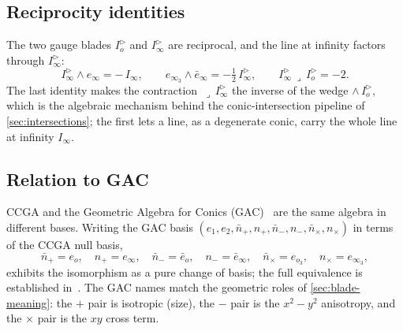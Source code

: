 \documentclass{birkjour}
\theoremstyle{definition}
\theoremstyle{remark}
\newcommand{\eo}{e_o}
\newcommand{\einf}{e_\infty}
\newcommand{\eobar}{\bar e_o}
\newcommand{\einfbar}{\bar e_\infty}
\newcommand{\Iod}{I_o^{\triangleright}}      %
\newcommand{\Iinfd}{I_\infty^{\triangleright}}%
\newcommand{\Iinf}{I_\infty}
\newcommand{\joinp}{\wedge}
\begin{document}
\subsection{Reciprocity identities}
\label{sec:reciprocity}
The two gauge blades $\Iod$ and $\Iinfd$ are reciprocal, and the line at infinity
factors through $\Iinfd$:
\begin{equation}\label{eq:reciprocity}
  \Iinfd \joinp \einf = -\,\Iinf,
  \qquad
  e_{\infty_3}\joinp\einfbar = -\tfrac12\,\Iinfd,
  \qquad
  \Iinfd \,\lrcorner\, \Iod = -2 .
\end{equation}
The last identity makes the contraction $\,\lrcorner\,\Iinfd$ the inverse of the
wedge $\joinp\,\Iod$, which is the algebraic mechanism behind the conic-intersection
pipeline of \cref{sec:intersections}; the first lets a line, as a degenerate conic,
carry the whole line at infinity $\Iinf$.

\subsection{Relation to GAC}
\label{sec:gac}
CCGA and the Geometric Algebra for Conics (GAC)~\cite{hrdina_geometric_2018} are
the same algebra in different bases. Writing the GAC basis
$\left(e_1,e_2,\bar n_+, n_+,\bar n_-, n_-,\bar n_\times, n_\times\right)$ in terms
of the CCGA null basis,
\begin{equation}\label{eq:gac-dictionary}
  \bar n_+ = \eo,\quad n_+ = \einf,\quad
  \bar n_- = \eobar,\quad n_- = \einfbar,\quad
  \bar n_\times = e_{o_3},\quad n_\times = e_{\infty_3},
\end{equation}
exhibits the isomorphism as a pure change of basis; the full equivalence is
established in~\cite{chomicki_intersection_2023}. The GAC names match the geometric
roles of \cref{sec:blade-meaning}: the $+$ pair is isotropic (size), the $-$ pair
is the $x^2-y^2$ anisotropy, and the $\times$ pair is the $xy$ cross term.

\end{document}
